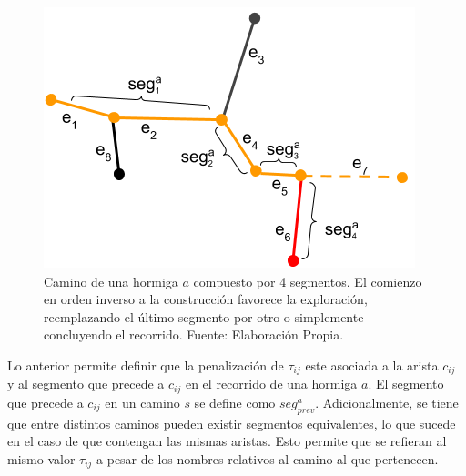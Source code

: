\begin{figure}[h!]
    \centering
    \includegraphics{imagenes/ant_segments_complex_case_H.png}
    \caption{Camino de una hormiga $a$ compuesto por 4 segmentos. El comienzo en orden inverso a la construcci\'on favorece la exploraci\'on, reemplazando el \'ultimo segmento por otro o simplemente concluyendo el recorrido. Fuente: Elaboraci\'on Propia.}
    \label{fig:segmentComplexCaseH}
\end{figure}

Lo anterior permite definir que la penalizaci\'on de $\tau_{ij}$ este asociada a la arista $c_{ij}$ y al segmento que precede a $c_{ij}$ en el recorrido de una hormiga $a$. El segmento que precede a $c_{ij}$ en un camino $s$ se define como $seg^{a}_{prev}$. Adicionalmente, se tiene que entre distintos caminos pueden existir segmentos equivalentes, lo que sucede en el caso de que contengan las mismas aristas. Esto permite que se refieran al mismo valor $\tau_{ij}$ a pesar de los nombres relativos al camino al que pertenecen. 

